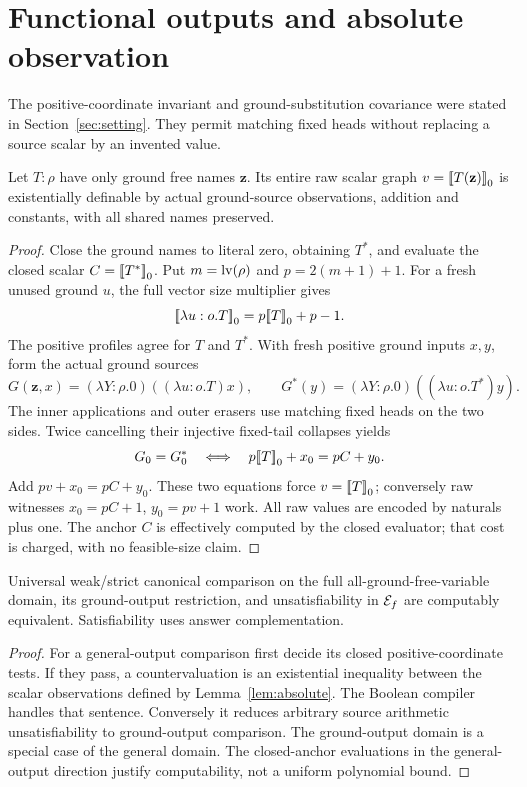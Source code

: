 \section{Functional outputs and absolute observation}\label{sec:absolute}

The positive-coordinate invariant and ground-substitution covariance
were stated in Section~\ref{sec:setting}. They permit matching fixed
heads without replacing a source scalar by an invented value.

\begin{lemma}\label{lem:absolute}
Let $T:\rho$ have only ground free names $\mathbf z$.  Its entire raw scalar
graph $v=\mathopen{[\![}T(\mathbf z)\mathclose{]\!]}_0$ is existentially definable by actual ground-source
observations, addition and constants, with all shared names preserved.
\end{lemma}
\begin{proof}
Close the ground names to literal zero, obtaining $T^*$, and evaluate the
closed scalar $C=\mathopen{[\![}T^*\mathclose{]\!]}_0$.  Put $m=\operatorname{lv}(\rho)$ and $p=2(m+1)+1$.
For a fresh unused ground $u$, the full vector size multiplier gives
\[
 \mathopen{[\![}\lambda u:o.T\mathclose{]\!]}_0=p\mathopen{[\![}T\mathclose{]\!]}_0+p-1.
\]
The positive profiles agree for $T$ and $T^*$.  With fresh positive ground
inputs $x,y$, form the actual ground sources
\[
 G(\mathbf z,x)=(\lambda Y:\rho.0)((\lambda u:o.T)x),\qquad
 G^*(y)=(\lambda Y:\rho.0)((\lambda u:o.T^*)y).
\]
The inner applications and outer erasers use matching fixed heads on the two
sides.  Twice cancelling their injective fixed-tail collapses yields
\[
 G_0=G^*_0\quad\Longleftrightarrow\quad
 p\mathopen{[\![}T\mathclose{]\!]}_0+x_0=pC+y_0.
\]
Add $pv+x_0=pC+y_0$.  These two equations force $v=\mathopen{[\![}T\mathclose{]\!]}_0$;
conversely raw witnesses $x_0=pC+1$, $y_0=pv+1$ work.  All raw values are
encoded by naturals plus one.  The anchor $C$ is effectively computed by the
closed evaluator; that cost is charged, with no feasible-size claim.
\end{proof}

\begin{theorem}\label{thm:decision-equivalence}
Universal weak/strict canonical comparison on the full all-ground-free-variable
domain, its ground-output restriction, and unsatisfiability in $\mathcal E_f$ are
computably equivalent.  Satisfiability uses answer complementation.
\end{theorem}
\begin{proof}
For a general-output comparison first decide its closed positive-coordinate
tests.  If they pass, a countervaluation is an existential inequality between
the scalar observations defined by Lemma~\ref{lem:absolute}.  The Boolean
compiler handles that sentence.  Conversely it reduces arbitrary source
arithmetic unsatisfiability to ground-output comparison.  The ground-output
domain is a special case of the general domain.  The closed-anchor evaluations
in the general-output direction justify computability, not a uniform
polynomial bound.
\end{proof}

